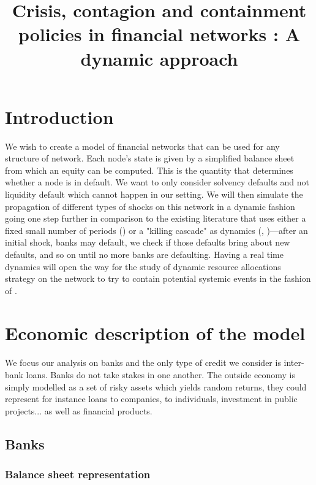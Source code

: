 \documentclass{article}
\title{Crisis, contagion and containment policies in financial networks : A dynamic approach}
\begin{document}
\maketitle

\section{Introduction}

We wish to create a model of financial networks that can be used for any structure of network. Each node's state is given by a simplified balance sheet from which an equity can be computed. This is the quantity that determines whether a node is in default. We want to only consider solvency defaults and not liquidity default which cannot happen in our setting.  We will then simulate the propagation of different types of shocks on this network in a dynamic fashion going one step further in comparison to the existing literature that uses either a fixed small number of periods (\cite{10}) or a "killing cascade" as dynamics (\cite{1.1}, \cite{11})---after an initial shock, banks may default, we check if those defaults bring about new defaults, and so on until no more banks are defaulting. Having a real time dynamics will open the way for the study of dynamic resource allocations strategy on the network to try to contain potential systemic events in the fashion of \cite{5.2}.

\section{Economic description of the model}

\paragraph{}
We focus our analysis on banks and the only type of credit we consider is inter-bank loans. Banks do not take stakes in one another. The outside economy is simply modelled as a set of risky assets which yields random returns, they could represent for instance loans to companies, to individuals, investment in public projects... as well as financial products.

\subsection{Banks}

\subsubsection{Balance sheet representation}
\end{document}

